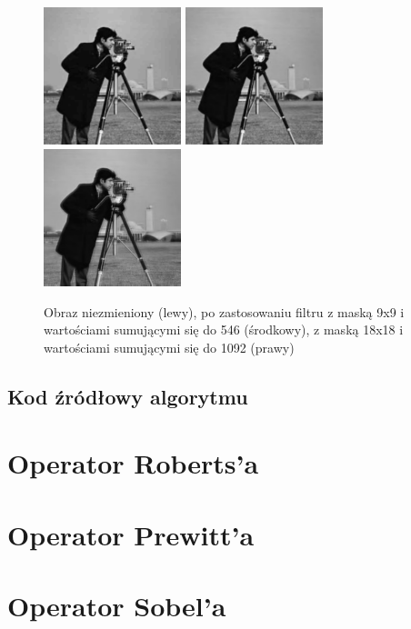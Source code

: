 \documentclass[a4paper,12pt]{book}
\begin{document}
			\begin{figure}[H]
				\caption{Obraz niezmieniony (lewy), po zastosowaniu filtru z maską 9x9 i wartościami sumującymi się do 546 (środkowy), z maską 18x18 i wartościami sumującymi się do 1092 (prawy)}
				\includegraphics[width=4cm, height=4cm]{man-unmodified.jpg}
				\includegraphics[width=4cm, height=4cm]{man-filter-gaussianblur9x9f546.png}
				\includegraphics[width=4cm, height=4cm]{man-filter-gaussianblur18x18f1092.png}
			\end{figure}
		\subsection{Kod źródłowy algorytmu}
	\section{Operator Roberts’a}
	\section{Operator Prewitt’a}
	\section{Operator Sobel’a}
\end{document}
